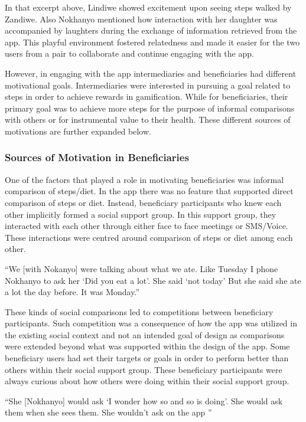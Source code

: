 In that excerpt above, Lindiwe showed excitement upon seeing steps walked by Zandiwe. Also Nokhanyo mentioned how interaction with her daughter was accompanied by laughters during the exchange of information retrieved from the app. This playful environment fostered relatedness and made it easier for the two users from a pair to collaborate and continue engaging with the app. 

However, in engaging with the app intermediaries and beneficiaries had different motivational goals. Intermediaries were interested in pursuing a goal related to steps in order to achieve rewards in gamification. While for beneficiaries, their primary goal was to achieve more steps for the purpose of informal comparisons with others or for instrumental value to their health. These different sources of motivations are further expanded below.
\subsubsection{Sources of Motivation in Beneficiaries}
One of the factors that played a role in motivating beneficiaries was informal comparison of steps/diet. In the app there was no feature that supported direct comparison of steps or diet. Instead, beneficiary participants who knew each other implicitly formed a social support group. In this support group, they interacted with each other through either face to face meetings or SMS/Voice. These interactions were centred around comparison of steps or diet among each other. 

 {``We [with Nokanyo] were talking about what we ate. Like Tuesday I phone Nokhanyo to ask her `Did you eat a lot'. She said `not today' But she said she ate a lot the day before. It was Monday.''}

These kinds of social comparisons led to competitions between beneficiary participants. Such competition was a  consequence of how the app was utilized in the existing social context and not an intended goal of design as comparisons were extended beyond what was supported within the design of the app.  Some beneficiary users had set their targets or goals in order to perform better than others within their social support group. These beneficiary participants were always curious about how others were doing within their social support group.
 
 {``She [Nokhanyo] would ask `I wonder how so and so is doing'. She would ask them when she sees them. She wouldn't ask on the app ''}

